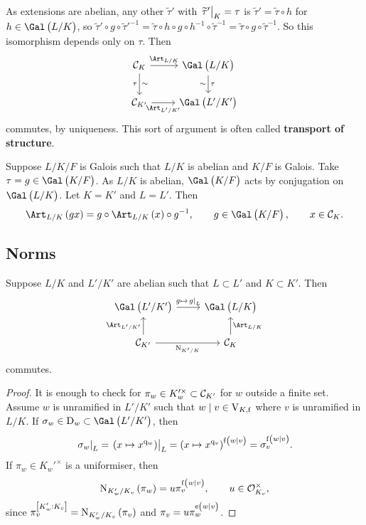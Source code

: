 \pagebreak

As extensions are abelian, any other $ \widetilde{\tau}' $ with $ \left. \widetilde{\tau}' \right|_K = \tau $ is $ \widetilde{\tau}' = \widetilde{\tau} \circ h $ for $ h \in \Gal\br{L / K} $, so $ \widetilde{\tau}' \circ g \circ \widetilde{\tau}'^{-1} = \widetilde{\tau} \circ h \circ g \circ h^{-1} \circ \widetilde{\tau}^{-1} = \widetilde{\tau} \circ g \circ \widetilde{\tau}^{-1} $. So this isomorphism depends only on $ \tau $. Then
$$
\begin{tikzcd}
\CCC_K \arrow{r}{\Art_{L / K}} \arrow{d}{\sim}[swap]{\tau} & \Gal\br{L / K} \arrow{d}{\tau}[swap]{\sim} \\
\CCC_{K'} \arrow{r}[swap]{\Art_{L' / K'}} & \Gal\br{L' / K'}
\end{tikzcd}
$$
commutes, by uniqueness. This sort of argument is often called \textbf{transport of structure}.

\begin{example*}
Suppose $ L / K / F $ is Galois such that $ L / K $ is abelian and $ K / F $ is Galois. Take $ \tau = g \in \Gal\br{K / F} $. As $ L / K $ is abelian, $ \Gal\br{K / F} $ acts by conjugation on $ \Gal\br{L / K} $. Let $ K = K' $ and $ L = L' $. Then
\begin{equation}
\label{eq:5}
\Art_{L / K}\br{gx} = g \circ \Art_{L / K}\br{x} \circ g^{-1}, \qquad g \in \Gal\br{K / F}, \qquad x \in \CCC_K.
\end{equation}
\end{example*}

\subsection{Norms}

\begin{proposition}
Suppose $ L / K $ and $ L' / K' $ are abelian such that $ L \subset L' $ and $ K \subset K' $. Then
$$
\begin{tikzcd}
\Gal\br{L' / K'} \arrow{r}{g \mapsto \eval{g}_L} & \Gal\br{L / K} \\
\CCC_{K'} \arrow{u}{\Art_{L' / K'}} \arrow{r}[swap]{\N_{K' / K}} & \CCC_K \arrow{u}[swap]{\Art_{L / K}}
\end{tikzcd}
$$
commutes.
\end{proposition}

\begin{proof}
It is enough to check for $ \pi_w \in K_w'^\times \subset \mathcal{C}_{K'} $ for $ w $ outside a finite set. Assume $ w $ is unramified in $ L' / K' $ such that $ w \mid v \in \mathrm{V}_{K, \mathrm{f}} $ where $ v $ is unramified in $ L / K $. If $ \sigma_w \in \D_w \subset \Gal\br{L' / K'} $, then
$$ \eval{\sigma_w}_L = \eval{\br{x \mapsto x^{\q_w}}}_L = \br{x \mapsto x^{\q_v}}^{\f\br{w \mid v}} = \sigma_v^{\f\br{w \mid v}}. $$
If $ \pi_w \in K_w'^\times $ is a uniformiser, then
$$ \N_{K_w' / K_v}\br{\pi_w} = u\pi_v^{\f\br{w \mid v}}, \qquad u \in \OOO_{K_v}^\times, $$
since $ \pi_v^{\sbr{K_w' : K_v}} = \N_{K_w' / K_v}\br{\pi_v} $ and $ \pi_v = u\pi_w^{\e\br{w \mid v}} $.
\end{proof}

